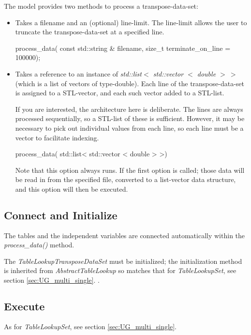 \documentclass[11pt,fleqn]{report}
\begin{document}
The model provides two methods to process a transpose-data-set:
\begin{itemize}
\item Takes a filename and an (optional) line-limit.  The line-limit allows the
user to truncate the transpose-data-set at a specified line.
\begin{code}
  process_data( const std::string & filename,
                size_t terminate_on_line = 100000);
\end{code}

\item Takes a reference to an instance of
      \textit{std::list$<$ std::vector $<$ double $> ~ >$} (which is a list of
      vectors of type-double).  Each line of the transpose-data-set is
      assigned to a STL-vector, and each such vector added to a STL-list.

      If you are interested, the architecture here is deliberate.  The lines
      are always processed sequentially, so a STL-list of these is sufficient.
      However, it may be necessary to pick out individual values from each
      line, so each line must be a vector to facilitate indexing.
\begin{code}
  process_data( std::list< std::vector < double >  >)
\end{code}

Note that this option always runs.  If the first option is called; those data
will be read in from the specified file, converted to a list-vector data
structure, and this option will then be executed.

\end{itemize}



\subsection{Connect and Initialize}
The tables and the independent variables are connected automatically within the
\textit{process\_data()} method.

The \textit{TableLookupTransposeDataSet} must be initialized; the
initialization method is inherited from \textit{AbstractTableLookup} so matches
that for \textit{TableLookupSet}, see section \ref{sec:UG_multi_single}.
.

\subsection{Execute}
As for \textit{TableLookupSet}, see section \ref{sec:UG_multi_single}.
\end{document}
